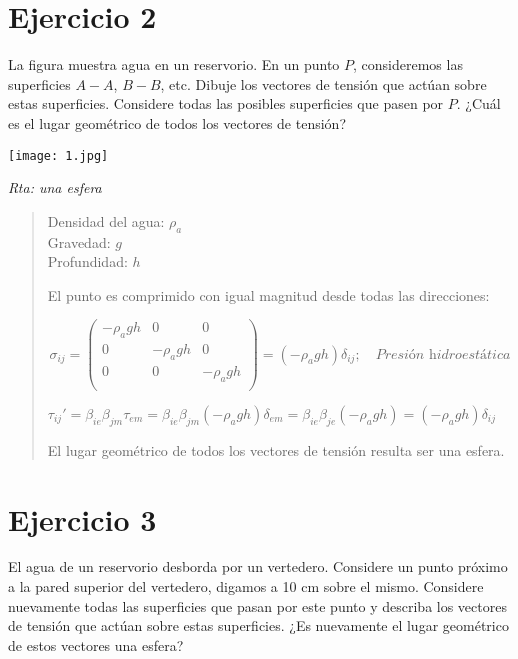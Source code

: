 \documentclass[a4paper,12pt,twoside,final,spanish]{article}
\begin{document}
\section*{Ejercicio 2}

La figura muestra agua en un reservorio. En un punto $P$, consideremos las superficies 
$A-A$, $B-B$, etc. Dibuje los vectores de tensión que actúan sobre estas superficies. 
Considere todas las posibles superficies que pasen por $P$. ¿Cuál es el lugar geométrico de todos los vectores de tensión? 

\begin{center}
\texttt{[image: 1.jpg]}
\end{center}

\textit{Rta: una esfera}

\dotfill

\begin{quote}

Densidad del agua: $\rho_{a}$\\
Gravedad: $g$\\
Profundidad: $h$

El punto es comprimido con igual magnitud desde todas las direcciones:

\[
\sigma_{ij}=
\left(\begin{matrix}
-\rho_{a}gh & 0 & 0\\
0 & -\rho_{a}gh & 0\\
0 & 0 & -\rho_{a}gh\\
\end{matrix}\right)
=(-\rho_{a}gh)\delta_{ij};\quad\textit{Presión hidroestática}
\]

$\tau_{ij}'=\beta_{ie}\beta_{jm}\tau_{em}=\beta_{ie}\beta_{jm}(-\rho_{a}gh)\delta_{em}=\beta_{ie}\beta_{je}(-\rho_{a}gh)=(-\rho_{a}gh)\delta_{ij}$

El lugar geométrico de todos los vectores de tensión resulta ser una esfera.

\end{quote}

\section*{Ejercicio 3}

El agua de un reservorio desborda por un vertedero. Considere un punto próximo a la 
pared superior del vertedero, digamos a 10 cm sobre el mismo. Considere nuevamente 
todas las superficies que pasan por este punto y describa los vectores de tensión que 
actúan sobre estas superficies. ¿Es nuevamente el lugar geométrico de estos vectores 
una esfera?\\
\end{document}
